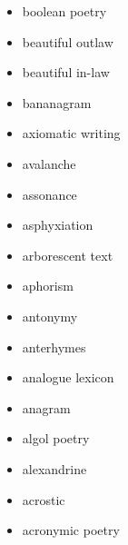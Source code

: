 \begin{multicols}{3}
\begin{itemize}
  \item boolean poetry
  \item beautiful outlaw
  \item beautiful in-law
  \item bananagram
  \item axiomatic writing
  \item avalanche
  \item assonance
  \item asphyxiation
  \item arborescent text
  \item aphorism
  \item antonymy
  \item anterhymes
  \item analogue lexicon
  \item anagram
  \item algol poetry
  \item alexandrine
  \item acrostic
  \item acronymic poetry
\end{itemize}
\end{multicols}
